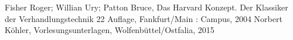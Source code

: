\begin{thebibliography}{99.}

 Fisher Roger; Willian Ury; Patton Bruce, Das Harvard Konzept. Der Klassiker der Verhandlungstechnik 22 Auflage, Fankfurt/Main : Campus,
2004 
 Norbert Köhler, Vorlesungsunterlagen, Wolfenbüttel/Ostfalia, 2015

\end{thebibliography}